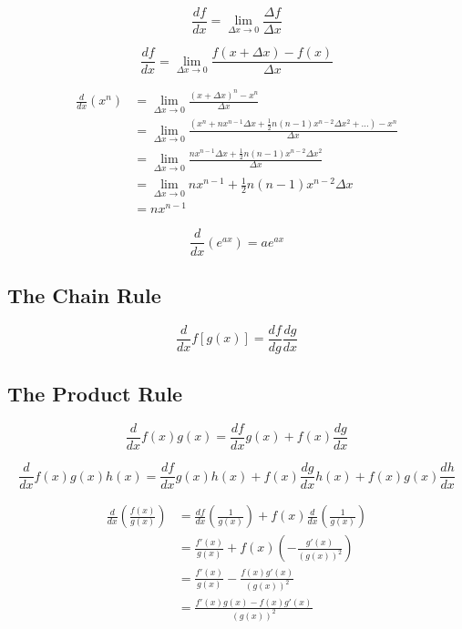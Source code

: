 \documentclass[]{report}
\begin{document}
\begin{equation*}
    \frac{df}{dx} = \lim_{\Delta x \to 0} \frac{\Delta f}{\Delta x}
\end{equation*}

\begin{equation*}
    \frac{df}{dx} = \lim_{\Delta x \to 0} \frac{f(x + \Delta x) - f(x)}{\Delta x}
\end{equation*}

\begin{align*}
    \frac{d}{dx}(x^{n}) &= \lim_{\Delta x \to 0} \frac{(x + \Delta x)^{n} - x^{n}}{\Delta x}\\
    &= \lim_{\Delta x \to 0} \frac{(x^{n} + n x^{n-1}\Delta x + \frac{1}{2}n(n-1)x^{n-2}\Delta x^{2} +\dots) - x^{n}}{\Delta x}\\
    &= \lim_{\Delta x \to 0} \frac{n x^{n-1}\Delta x + \frac{1}{2}n(n-1)x^{n-2}\Delta x^{2}}{\Delta x}\\
    &= \lim_{\Delta x \to 0} n x^{n-1} + \frac{1}{2}n(n-1)x^{n-2}\Delta x\\
    &= n x^{n-1}
\end{align*}

\begin{equation*}
    \frac{d}{dx}(e^{ax}) = ae^{ax}
\end{equation*}

\subsection{The Chain Rule}

\begin{equation*}
    \frac{d}{dx}f[g(x)] = \frac{df}{dg} \frac{dg}{dx}
\end{equation*}

\subsection{The Product Rule}

\begin{equation*}
    \frac{d}{dx} f(x)g(x) = \frac{df}{dx} g(x) + f(x)\frac{dg}{dx}
\end{equation*}

\begin{equation*}
    \frac{d}{dx} f(x)g(x)h(x) = \frac{df}{dx} g(x)h(x) + f(x)\frac{dg}{dx} h(x) + f(x)g(x) \frac{dh}{dx}
\end{equation*}

\begin{align*}
    \frac{d}{dx}\left(\frac{f(x)}{g(x)}\right) &= \frac{df}{dx}\left(\frac{1}{g(x)}\right) + f(x)\frac{d}{dx}\left(\frac{1}{g(x)}\right)\\
    &= \frac{f'(x)}{g(x)} + f(x)\left(- \frac{g'(x)}{(g(x))^2}\right)\\
    &= \frac{f'(x)}{g(x)} - \frac{f(x)g'(x)}{(g(x))^{2}}\\
    &= \frac{f'(x)g(x) - f(x)g'(x)}{(g(x))^{2}}
\end{align*}
\end{document}

